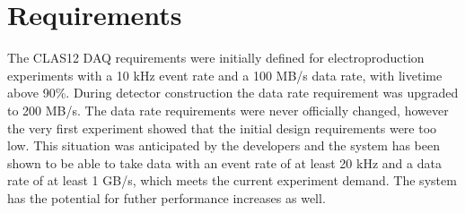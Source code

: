 \section{Requirements}

The CLAS12 DAQ requirements were initially defined for electroproduction experiments with a 10 kHz event rate and a 100 MB/s data rate, with livetime above 90\%. During detector construction the data rate requirement was upgraded to 200 MB/s. The data rate requirements were never officially changed, however the very first experiment showed that the initial design requirements were too low. This situation was anticipated by the developers and the system has been shown to be able to take data with an event rate of at least 20 kHz and a data rate of at least 1 GB/s, which meets the current experiment demand. The system has the potential for futher performance increases as well.

